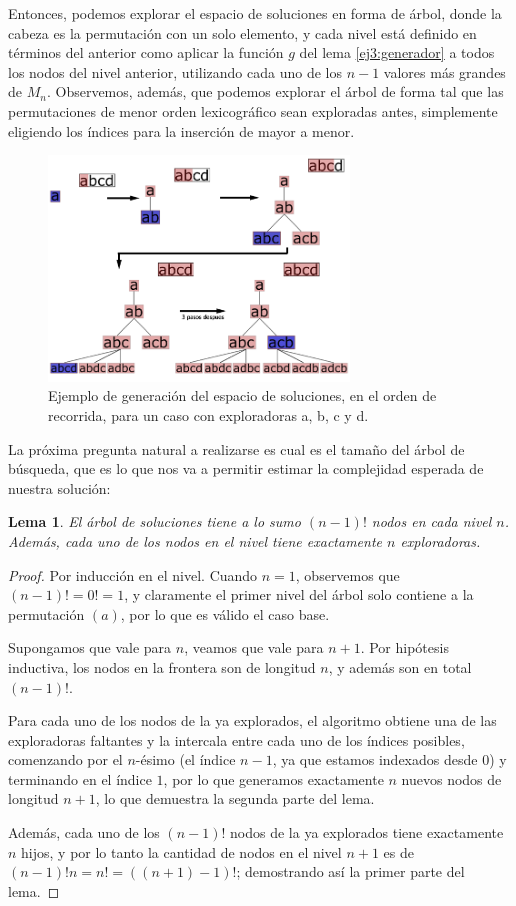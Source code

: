 \documentclass{article}
\newtheorem{lemma}{Lema}[theorem]
\theoremstyle{definition}
\theoremstyle{remark}
\begin{document}
Entonces, podemos explorar el espacio de soluciones en forma de árbol, donde la cabeza es la permutación con un solo elemento, y cada nivel está definido en términos del anterior como aplicar la función $g$ del lema \ref{ej3:generador} a todos los nodos del nivel anterior, utilizando cada uno de los $n-1$ valores más grandes de $M_n$. Observemos, además, que podemos explorar el árbol de forma tal que las permutaciones de menor orden lexicográfico sean exploradas antes, simplemente eligiendo los índices para la inserción de mayor a menor.

\begin{figure}[h!]
\centering
\includegraphics[width=8cm]{images/treeEvolution}
\caption{Ejemplo de generación del espacio de soluciones, en el orden de recorrida, para un caso con exploradoras a, b, c y d.}
\end{figure}

La próxima pregunta natural a realizarse es cual es el tamaño del árbol de búsqueda, que es lo que nos va a permitir estimar la complejidad esperada de nuestra solución:

\begin{lemma}
El árbol de soluciones tiene a lo sumo $(n-1)!$ nodos en cada nivel $n$. Además, cada uno de los nodos en el nivel tiene exactamente $n$ exploradoras.
\end{lemma}

\begin{proof}
Por inducción en el nivel. Cuando $n = 1$, observemos que $(n-1)! = 0! = 1$, y claramente el primer nivel del árbol solo contiene a la permutación $(a)$, por lo que es válido el caso base.

Supongamos que vale para $n$, veamos que vale para $n+1$. Por hipótesis inductiva, los nodos en la frontera son de longitud $n$, y además son en total $(n-1)!$.

Para cada uno de los nodos de la ya explorados, el algoritmo obtiene una de las exploradoras faltantes y la intercala entre cada uno de los índices posibles, comenzando por el $n$-ésimo (el índice $n-1$, ya que estamos indexados desde $0$) y terminando en el índice $1$, por lo que generamos exactamente $n$ nuevos nodos de longitud $n+1$, lo que demuestra la segunda parte del lema.

Además, cada uno de los $(n-1)!$ nodos de la ya explorados tiene exactamente $n$ hijos, y por lo tanto la cantidad de nodos en el nivel $n+1$ es de $(n-1)! n = n! = ((n + 1) - 1)!$; demostrando así la primer parte del lema.
\end{proof}
\end{document}

